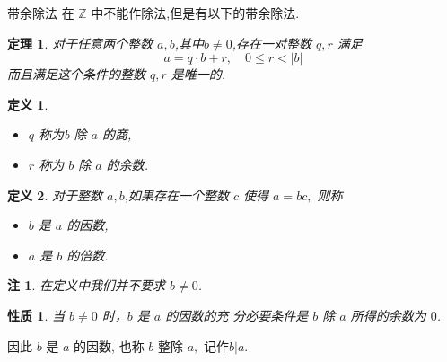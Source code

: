 \documentclass[11pt,punct]{ctexbeamer}
\newtheorem{thm}{定理}
\newtheorem*{defi}{定义}
\newtheorem*{rem}{注}
\newtheorem*{prop}{性质}
\begin{document}
\begin{frame}{带余除法}
在 $\mathbb{Z}$ 中不能作除法,但是有以下的\alert{带余除法}.
\begin{thm}
对于任意两个整数 $a ,b$,其中$b\neq 0$,存在一对整数 $q, r$ 满足
\[
a=q \cdot b+r, \quad 0 \leqslant r<|b|
\]
而且满足这个条件的整数 $q, r$ 是唯一的.
\end{thm}

\begin{defi}
\begin{itemize}
\item $q$ 称为b 除 $a$ 的\alert{商},
\item $r$ 称为 $b$ 除 $a$ 的\alert{余数}.
\end{itemize}
\end{defi}

\end{frame}



\begin{frame}
\begin{defi}
	对于整数 $a ,b$,如果存在一个整数 $c$ 使得 $a=b c,$ 则称
\begin{itemize}
\item $b$ 是 $a$ 的\alert{因数},
\item $a$ 是 $b$ 的\alert{倍数}.
\end{itemize}
\end{defi}
\begin{rem}
在定义中我们并不要求 $b\neq0$.
\end{rem}



    \begin{prop}
        当 $b\neq 0$ 时，$b$ 是 $a$ 的因数的充 分必要条件是 $b$ 除 $a$ 所得的余数为 $0$.
    \end{prop}
    因此 $b$ 是 $a$ 的因数, 也称 $b$ \alert{整除} $a,$ 记作$b | a$.

\end{frame}
\end{document}
